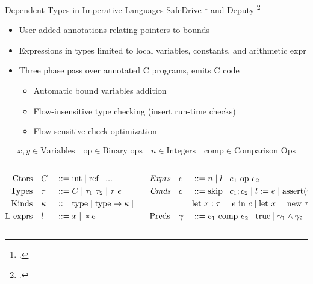 \documentclass[aspectratio=169]{beamer}
\begin{document}
\begin{frame}{Dependent Types in Imperative Languages}
SafeDrive \footcite{zhou_safedrive:_2006} and Deputy \footcite{condit_dependent_2007}
    \begin{itemize}
        \item User-added annotations relating pointers to bounds
        \item Expressions in types limited to local variables, constants, and arithmetic expr
        \item Three phase pass over annotated C programs, emits C code
            \begin{itemize}
                \item Automatic bound variables addition
                \item Flow-insensitive type checking (insert run-time checks)
                \item Flow-sensitive check optimization
            \end{itemize}
    \end{itemize}
\vspace{-0.3in}

\footnotesize{
\begin{gather*}
    x,y \in \text{Variables}
    \quad
    \text{op} \in \text{Binary ops}
    \quad
    n \in \text{Integers}
    \quad
    \text{comp} \in \text{Comparison Ops}
\end{gather*}

\vspace{-0.3in}

\begin{columns}[T]
\begin{column}{0.45\textwidth}
\begin{alignat*}{2}
\text{Ctors}\quad &C &&::= \text{int} \altm \text{ref} \altm ...
\\
\text{Types}\quad &\tau &&::= C \altm \tau_1 \ \tau_2 \altm \tau\ e
\\
\text{Kinds}\quad & \kappa &&::= \text{type} \altm \text{type} \rightarrow \kappa \altm \tau \rightarrow \kappa
\\
\text{L-exprs} \quad &l &&::= x \altm *e
\end{alignat*}
\end{column}

\begin{column}{0.45\textwidth}
\begin{alignat*}{2}
\textit{Exprs}\quad &e &&::= n \altm l \altm e_1 \text{ op } e_2
\\
\textit{Cmds}\quad &c &&::= \text{skip} \altm c_1;c_2 \altm l := e \altm \text{assert}(\gamma) \altm
\\
~ & ~ && \text{let } x : \tau = e \text { in } c \altm \text{let } x = \text{new } \tau(e) \text{ in } c
\\
\text{Preds}\quad &\gamma &&::= e_1 \text{ comp } e_2 \altm \text{true} \altm \gamma_1 \wedge \gamma_2
\end{alignat*}
\end{column}
\end{columns}
}


\end{frame}
\end{document}
